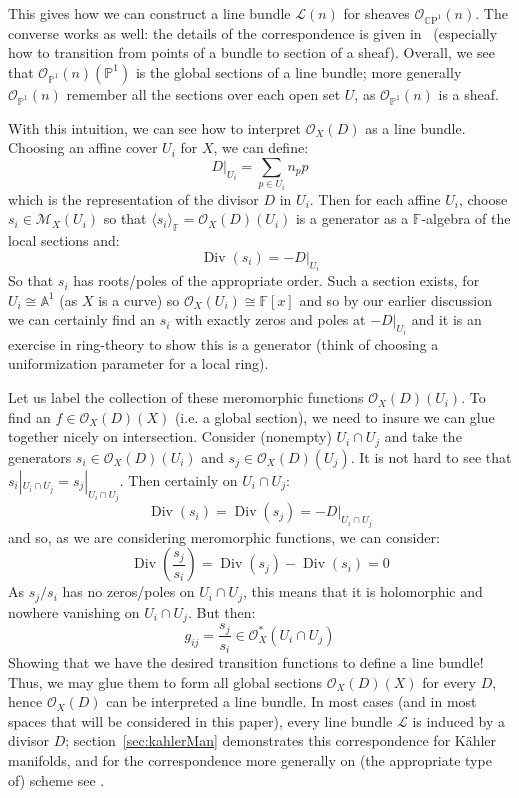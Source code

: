 \documentclass{ut-thesis}
\newcommand{\A}{{\mathbb{A}}}
\newcommand{\F}{{\mathbb{F}}}
\renewcommand{\P}{{\mathbb{P}}}
\newcommand{\CM}{{\mathcal{M}}}
\newcommand{\CL}{{\mathcal{L}}}
\newcommand{\CO}{{\mathcal{O}}}
\newcommand{\CP}{{\mathbb{C}\mathrm{P}}}
\renewcommand{\div}{{\operatorname{Div}}}
\begin{document}
This gives how we can construct a line bundle $\CL(n)$ for sheaves $\CO_{\CP^1}(n)$. The converse works as
well: the details of the correspondence is given in~\cite[section~4.1]{NateAlgGeo} (especially how to
transition from points of a bundle to section of a sheaf). Overall, we see that $\CO_{\P^1}(n)(\P^1)$ is the
global sections of a line bundle; more generally $\CO_{\P^1}(n)$ remember all the sections over each open set
$U$, as $\CO_{\P^1}(n)$ is a sheaf.

With this intuition, we can see how to interpret $\CO_X(D)$ as a line bundle. Choosing an affine cover $U_i$
for $X$, we can define:
\[
  D|_{U_i} = \sum_{p \in U_i} n_pp
\]
which is the representation of the divisor $D$ in $U_i$. Then for each affine $U_i$, choose $s_i \in \CM_X(U_i)$
so that $\langle s_i \rangle_\F = \CO_X(D)(U_i)$ is a generator as a $\F$-algebra of the local sections and:
\[
  \div(s_i) = -D|_{U_i}
\]
So that $s_i$ has roots/poles of the appropriate order. Such a section exists, for $U_i \cong \A^1$ (as $X$
is a curve) so $\CO_X(U_i) \cong \F[x]$ and so by our earlier discussion we can certainly find an $s_i$ with
exactly zeros and poles at $-D|_{U_i}$ and it is an exercise in ring-theory to show this is a generator (think
of choosing a uniformization parameter for a local ring).

Let us label the collection of these meromorphic functions $\CO_X(D)(U_i)$. To find an $f \in \CO_X(D)(X)$ (i.e.
a global section), we need to insure we can glue together nicely on intersection. Consider (nonempty)
$U_i\cap U_j$ and take the generators $s_i \in \CO_X(D)(U_i)$ and $s_j \in \CO_X(D)(U_j)$. It is not hard to
see that $s_i|_{U_i\cap U_j} =
s_j|_{U_i\cap U_j}$. Then certainly on $U_i\cap U_j$:
\[
  \div(s_i) = \div(s_j) = -D|_{U_i\cap U_j}
\]
and so, as we are considering meromorphic functions, we can consider:
\[
  \div \left(\frac{s_j}{s_i}\right) = \div(s_j) - \div(s_i) = 0
\]
As $s_j/s_i$ has no zeros/poles on $U_i\cap U_j$, this means that it is holomorphic and nowhere vanishing on
$U_i\cap U_j$. But then:
\[
  g_{ij} = \frac{s_j}{s_i} \in \CO_X^*(U_i\cap U_j)
\]
Showing that we have the desired transition functions to define a line bundle! Thus, we may glue them to form
all global sections $\CO_{X}(D)(X)$ for every $D$, hence $\CO_X(D)$ can be interpreted a line bundle. In most
cases (and in most spaces that will be considered in this paper), every line bundle $\CL$ is induced by a
divisor $D$; section~\ref{sec:kahlerMan} demonstrates this correspondence for K\"ahler manifolds, and for the
correspondence more generally on (the appropriate type of) scheme see \cite[section~4.3]{NateAlgGeo}.
\end{document}
